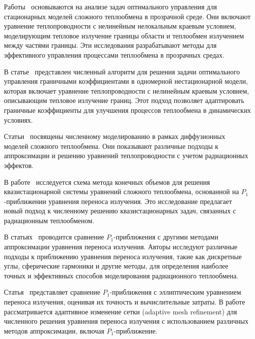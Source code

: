 Работы~\cite{birgelis2003optimal, meyer2006optimal, meyer2009state, Philip2010}
основываются на анализе задач оптимального управления для стационарных моделей
сложного теплообмена в прозрачной среде.
Они включают уравнение теплопроводности с нелинейным нелокальным краевым условием,
моделирующим тепловое излучение границы области и теплообмен излучением между частями границы.
Эти исследования разрабатывают методы для эффективного управления процессами теплообмена
в прозрачных средах.

В статье~\cite{belmiloudi2014nonlinear} представлен численный алгоритм для решения
задачи оптимального управления граничными коэффициентами в одномерной нестационарной модели,
которая включает уравнение теплопроводности с нелинейным краевым условием,
описывающим тепловое излучение границ.
Этот подход позволяет адаптировать граничные коэффициенты для улучшения процессов
теплообмена в динамических условиях.

Статьи~\cite{kovtanyuk2013iterative, Thommes2002, Pinnau2008, Siewert1991}
посвящены численному моделированию в рамках диффузионных моделей сложного теплообмена.
Они показывают различные подходы к аппроксимации и решению уравнений теплопроводности
с учетом радиационных эффектов.

В работе~\cite{gallouet2016analysis} исследуется схема метода конечных объемов
для решения квазистационарной системы уравнений сложного теплообмена,
основанной на $P_1$-приближении уравнения переноса излучения.
Это исследование предлагает новый подход к численному решению квазистационарных задач,
связанных с радиационным теплообменом.



В статьях~\cite{
    modest2014elliptic, frank2011adaptive, kovtanyuk2012, Thommes2002, Larsen2002, Frank2007
} проводится сравнение $P_1$-приближения с другими методами аппроксимации уравнения переноса излучения.
Авторы исследуют различные подходы к приближению уравнения переноса излучения,
такие как дискретные углы, сферические гармоники и другие методы,
для определения наиболее точных и эффективных способов моделирования радиационного теплообмена.

Статья~\cite{modest2014elliptic} представляет сравнение $P_1$-приближения
с эллиптическим уравнением переноса излучения, оценивая их точность и вычислительные затраты.
В работе~\cite{frank2011adaptive} рассматривается
адаптивное изменение сетки (adaptive mesh refinement)
для численного решения уравнения переноса излучения
с использованием различных методов аппроксимации, включая $P_1$-приближение.

